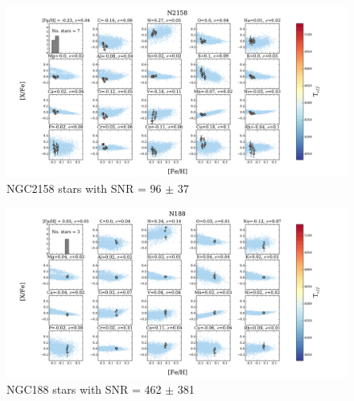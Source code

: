 \documentclass[14pt, preprint2]{aastex6}
\begin{document}
\begin{figure}
\centering
                     \includegraphics[scale=0.5]{20elem11_tc2_nofilt.pdf}
  \caption{ NGC2158 stars with SNR = 96 $\pm$ 37 }
\label{fig:c3}
\end{figure}

\begin{figure}
\centering
                 \includegraphics[scale=0.5]{20elem10_tc2_nofilt.pdf}
  \caption{ NGC188 stars with SNR = 462 $\pm$ 381}
\label{fig:c4}
\end{figure}
\end{document}
